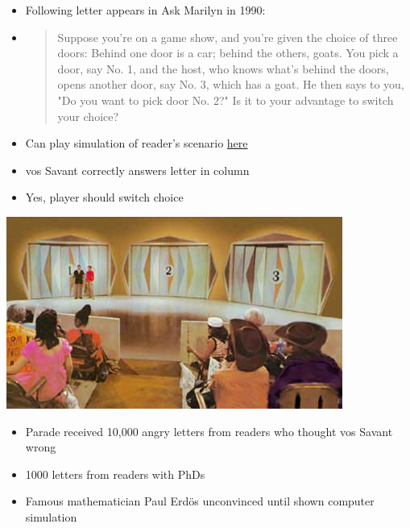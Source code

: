 \documentclass[handout]{beamer}
\theoremstyle{definition}
\begin{document}
\begin{frame}
\begin{itemize}
\item Following letter appears in \alert{Ask Marilyn} in 1990:
\item\begin{quotation}
Suppose you're on a game show, and you're given the choice of three
doors: Behind one door is a car; behind the others, goats. You pick
a door, say No. 1, and the host, who knows what's behind the doors,
opens another door, say No. 3, which has a goat. He then says to
you, "Do you want to pick door No. 2?" Is it to your advantage to
switch your choice?
\end{quotation}
\item Can play simulation of reader's scenario
\href{http://math.ucsd.edu/~crypto/Monty/monty.html}
{\color{blue}here}
\item vos Savant correctly answers letter in column
\item \alert{Yes}, player should switch choice
\end{itemize}
\end{frame}

\begin{frame}
\begin{center}\includegraphics[scale=.5]{Doors}\end{center}
\begin{itemize}
\item Parade received 10,000 angry letters from readers who thought
vos Savant wrong
\item 1000 letters from readers with PhDs
\item Famous mathematician
Paul Erd\"os unconvinced until shown computer simulation
\end{itemize}
\end{frame}
\end{document}

